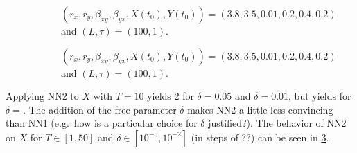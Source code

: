 \documentclass[a4paper,11pt]{article}
\begin{document}
\begin{figure}[h!t]
\centering
\begin{subfigure}[b]{0.4\textwidth}
\label{fig:SugExNN1vT}
\caption{ $\left(r_x,r_y,\beta_{xy},\beta_{yx},X(t_0),Y(t_0)\right) = \left(3.8,3.5,0.01,0.2,0.4,0.2\right)$ and $\left(L,\tau\right) = \left(100,1\right)$.}
\end{subfigure}
\begin{subfigure}[b]{0.4\textwidth}
\label{fig:SugExNN1vTvd}
\caption{ $\left(r_x,r_y,\beta_{xy},\beta_{yx},X(t_0),Y(t_0)\right) = \left(3.8,3.5,0.01,0.2,0.4,0.2\right)$ and $\left(L,\tau\right) = \left(100,1\right)$.}
\end{subfigure}
\caption{}
\end{figure}
Applying NN2 to $X$ with $T=10$ yields 2 for $\delta=0.05$ and $\delta=0.01$, but yields for $\delta=$.  The addition of the free parameter $\delta$ makes NN2 a little less convincing than NN1 (e.g.\ how is a particular choice for $\delta$ justified?).  The behavior of NN2 on $X$ for $T\in[1,50]$ and $\delta\in[10^{-5},10^{-2}]$ (in steps of ??) can be seen in \ref{fig:SugExNN1vTvd}.
\end{document}
